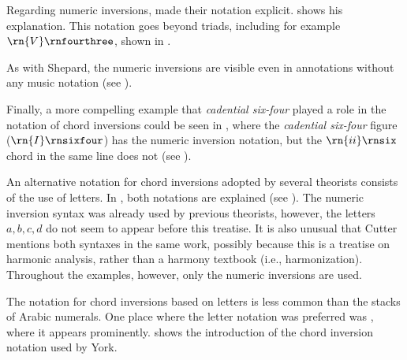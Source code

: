 
Regarding numeric inversions, \textcite{chadwick1897harmony}
made their notation explicit.
shows his explanation. This notation goes beyond triads,
including for example $\rn{V}\rnfourthree$, shown in
.




As with Shepard, the numeric inversions are visible even in
annotations without any music notation (see
).



Finally, a more compelling example that \emph{cadential
six-four} played a role in the notation of chord inversions
could be seen in \textcite{loewengard1908lehrbuch}, where
the \emph{cadential six-four} figure ($\rn{I}\rnsixfour$)
has the numeric inversion notation, but the $\rn{ii}\rnsix$
chord in the same line does not (see
).


An alternative notation for chord inversions adopted by
several theorists consists of the use of letters. In
\textcite{cutter1902harmonic}, both notations are explained
(see ). The
numeric inversion syntax was already used by previous
theorists, however, the letters ${a, b, c , d}$ do not seem
to appear before this treatise. It is also unusual that
Cutter mentions both syntaxes in the same work, possibly
because this is a treatise on harmonic analysis, rather than
a harmony textbook (i.e., harmonization). Throughout the
examples, however, only the numeric inversions are used.

The notation for chord inversions based on letters is less
common than the stacks of Arabic numerals. One place where
the letter notation was preferred was
\textcite{york1909practical}, where it appears prominently.
 shows the
introduction of the chord inversion notation used by York.

